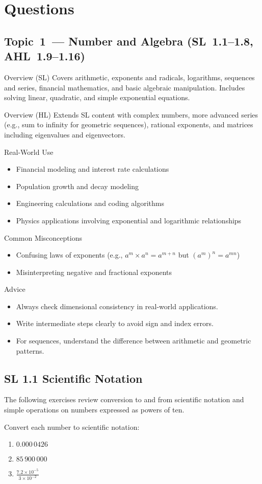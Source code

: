 \documentclass[11pt]{article}
\def\textbf#1{#1}%
\newcommand{\tocsection}[1]{\section{#1}}
\newcommand{\tocsubsection}[1]{\subsection{#1}}
\newcounter{question}
\begin{document}
\tocsection{Questions}

\tocsubsection{Topic 1 — Number and Algebra (SL 1.1–1.8, AHL 1.9–1.16)}
\textbf{Overview (SL)}  
Covers arithmetic, exponents and radicals, logarithms, sequences and series, financial mathematics, and basic algebraic manipulation. Includes solving linear, quadratic, and simple exponential equations.

\textbf{Overview (HL)}  
Extends SL content with complex numbers, more advanced series (e.g., sum to infinity for geometric sequences), rational exponents, and matrices including eigenvalues and eigenvectors.

\textbf{Real-World Use}  
\begin{itemize}
  \item Financial modeling and interest rate calculations
  \item Population growth and decay modeling
  \item Engineering calculations and coding algorithms
  \item Physics applications involving exponential and logarithmic relationships
\end{itemize}

\textbf{Common Misconceptions}  
\begin{itemize}
  \item Confusing laws of exponents (e.g., $a^m \times a^n = a^{m+n}$ but $(a^m)^n = a^{mn}$)
  \item Misinterpreting negative and fractional exponents
\end{itemize}

\textbf{Advice}  
\begin{itemize}
  \item Always check dimensional consistency in real-world applications.
  \item Write intermediate steps clearly to avoid sign and index errors.
  \item For sequences, understand the difference between arithmetic and geometric patterns.
\end{itemize}

\tocsubsection{SL  1.1  \; Scientific  Notation}
The following exercises review conversion to and from scientific notation and
simple operations on numbers expressed as powers of ten.

\begin{question}
Convert each number to scientific notation:
\begin{enumerate}[label=\alph*)]
\item $0.000\,0426$
\item $85\,900\,000$
\item $\displaystyle\frac{7.2\times 10^{-5}}{3\times 10^{-2}}$
\end{enumerate}
\end{question}
\end{document}
